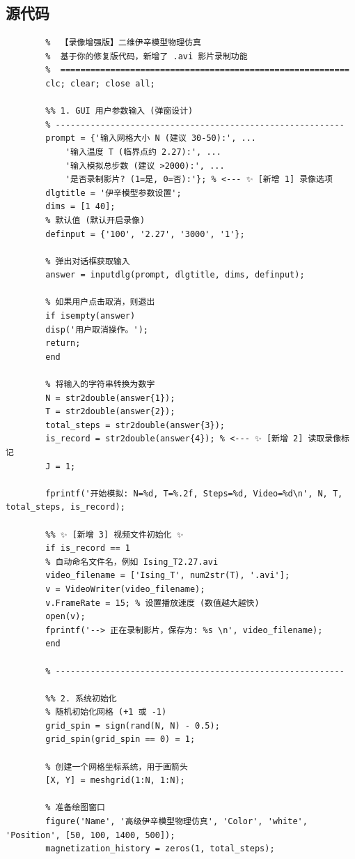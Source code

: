\documentclass[supercite]{Experimental_Report}
\theoremstyle{definition}
\begin{document}
	\subsection{源代码}
	\begin{lstlisting}[style=commonCodeStyle, caption={lsing-model simulater.m}, label={lst:1-1}]
		%% ==========================================================
		%  【录像增强版】二维伊辛模型物理仿真
		%  基于你的修复版代码，新增了 .avi 影片录制功能
		%  ==========================================================
		clc; clear; close all;
		
		%% 1. GUI 用户参数输入 (弹窗设计)
		% ----------------------------------------------------------
		prompt = {'输入网格大小 N (建议 30-50):', ...
			'输入温度 T (临界点约 2.27):', ...
			'输入模拟总步数 (建议 >2000):', ...
			'是否录制影片? (1=是, 0=否):'}; % <--- ✨ [新增 1] 录像选项
		dlgtitle = '伊辛模型参数设置';
		dims = [1 40];
		% 默认值 (默认开启录像)
		definput = {'100', '2.27', '3000', '1'}; 
		
		% 弹出对话框获取输入
		answer = inputdlg(prompt, dlgtitle, dims, definput);
		
		% 如果用户点击取消，则退出
		if isempty(answer)
		disp('用户取消操作。');
		return;
		end
		
		% 将输入的字符串转换为数字
		N = str2double(answer{1});
		T = str2double(answer{2});
		total_steps = str2double(answer{3});
		is_record = str2double(answer{4}); % <--- ✨ [新增 2] 读取录像标记
		J = 1; 
		
		fprintf('开始模拟: N=%d, T=%.2f, Steps=%d, Video=%d\n', N, T, total_steps, is_record);
		
		%% ✨ [新增 3] 视频文件初始化 ✨
		if is_record == 1
		% 自动命名文件名，例如 Ising_T2.27.avi
		video_filename = ['Ising_T', num2str(T), '.avi'];
		v = VideoWriter(video_filename); 
		v.FrameRate = 15; % 设置播放速度 (数值越大越快)
		open(v);
		fprintf('--> 正在录制影片，保存为: %s \n', video_filename);
		end
		
		% ----------------------------------------------------------
		
		%% 2. 系统初始化
		% 随机初始化网格 (+1 或 -1)
		grid_spin = sign(rand(N, N) - 0.5); 
		grid_spin(grid_spin == 0) = 1; 
		
		% 创建一个网格坐标系统，用于画箭头
		[X, Y] = meshgrid(1:N, 1:N);
		
		% 准备绘图窗口
		figure('Name', '高级伊辛模型物理仿真', 'Color', 'white', 'Position', [50, 100, 1400, 500]);
		magnetization_history = zeros(1, total_steps);
		

\end{lstlisting}
\end{document}
